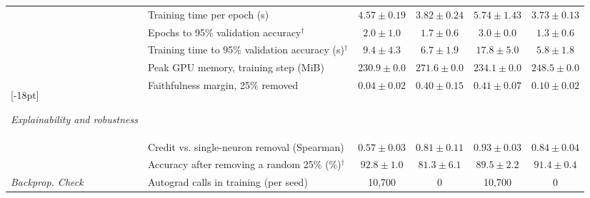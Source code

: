 \documentclass{article}
\begin{document}
\begin{table}[H]
\begin{tabular}{>{\raggedright\arraybackslash}p{2.1cm}>{\raggedright\arraybackslash}p{3.5cm}cccc}
 & Training time per epoch (s) & $4.57 \pm 0.19$ & $\boldsymbol{3.82 \pm 0.24}$ & $5.74 \pm 1.43$ & $\boldsymbol{3.73 \pm 0.13}$ \\
 & Epochs to 95\% validation accuracy$^\dagger$ & $2.0 \pm 1.0$ & $\boldsymbol{1.7 \pm 0.6}$ & $3.0 \pm 0.0$ & $\boldsymbol{1.3 \pm 0.6}$ \\
 & Training time to 95\% validation accuracy (s)$^\dagger$ & $9.4 \pm 4.3$ & $\boldsymbol{6.7 \pm 1.9}$ & $17.8 \pm 5.0$ & $\boldsymbol{5.8 \pm 1.8}$ \\
 & Peak GPU memory, training step (MiB) & $\boldsymbol{230.9 \pm 0.0}$ & $271.6 \pm 0.0$ & $\boldsymbol{234.1 \pm 0.0}$ & $248.5 \pm 0.0$ \\
\midrule
\multirow{3}{*}[-18pt]{\parbox[c]{2.1cm}{\raggedright\textit{Explainability and robustness}}} & Faithfulness margin, 25\% removed & $0.04 \pm 0.02$ & $\boldsymbol{0.40 \pm 0.15}$ & $\boldsymbol{0.41 \pm 0.07}$ & $0.10 \pm 0.02$ \\
 & Credit vs. single-neuron removal (Spearman) & $0.57 \pm 0.03$ & $\boldsymbol{0.81 \pm 0.11}$ & $\boldsymbol{0.93 \pm 0.03}$ & $0.84 \pm 0.04$ \\
 & Accuracy after removing a random 25\% (\%)$^\dagger$ & $\boldsymbol{92.8 \pm 1.0}$ & $81.3 \pm 6.1$ & $89.5 \pm 2.2$ & $\boldsymbol{91.4 \pm 0.4}$ \\
\midrule
\textit{Backprop. Check} & Autograd calls in training (per seed) & 10{,}700 & 0 & 10{,}700 & 0 \\
\bottomrule
\end{tabular}
\end{table}
\end{document}
